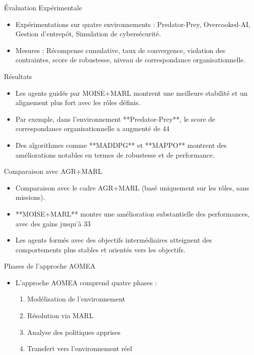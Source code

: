 \documentclass{beamer}
\begin{document}
\begin{frame}{Évaluation Expérimentale}
    \begin{itemize}
        \item Expérimentations sur quatre environnements : Predator-Prey, Overcooked-AI, Gestion d'entrepôt, Simulation de cybersécurité.
        \item Mesures : Récompense cumulative, taux de convergence, violation des contraintes, score de robustesse, niveau de correspondance organisationnelle.
    \end{itemize}
\end{frame}

\begin{frame}{Résultats}
    \begin{itemize}
        \item Les agents guidés par MOISE+MARL montrent une meilleure stabilité et un alignement plus fort avec les rôles définis.
        \item Par exemple, dans l'environnement **Predator-Prey**, le score de correspondance organisationnelle a augmenté de 44%
        \item Des algorithmes comme **MADDPG** et **MAPPO** montrent des améliorations notables en termes de robustesse et de performance.
    \end{itemize}
\end{frame}

\begin{frame}{Comparaison avec AGR+MARL}
    \begin{itemize}
        \item Comparaison avec le cadre AGR+MARL (basé uniquement sur les rôles, sans missions).
        \item **MOISE+MARL** montre une amélioration substantielle des performances, avec des gains jusqu'à 33%
        \item Les agents formés avec des objectifs intermédiaires atteignent des comportements plus stables et orientés vers les objectifs.
    \end{itemize}
\end{frame}

\begin{frame}{Phases de l'approche AOMEA}
    \begin{itemize}
        \item L'approche AOMEA comprend quatre phases :
        \begin{enumerate}
            \item Modélisation de l'environnement
            \item Résolution via MARL
            \item Analyse des politiques apprises
            \item Transfert vers l'environnement réel
        \end{enumerate}
    \end{itemize}
\end{frame}
\end{document}
